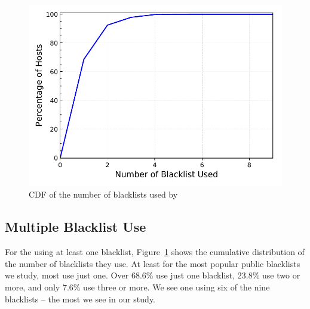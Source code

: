 


\begin{figure}[t]
  \centering
  \includegraphics[width=0.8\linewidth]{images/perfect_shared_cdf_v2.pdf}
  \caption{CDF of the number of blacklists used by {}}
  \label{fig:perfect-shared-cdf}
\end{figure}

\subsection{Multiple Blacklist Use}

For the {} using at least one blacklist,
Figure~\ref{fig:perfect-shared-cdf} shows the cumulative distribution
of the number of blacklists they use.  At least for the most popular
public blacklists we study, most use just one.  Over 68.6\% use just
one blacklist, 23.8\% use two or more, and only 7.6\% use three or more.
We see one {} using six of the nine blacklists -- the most
we see in our study.

